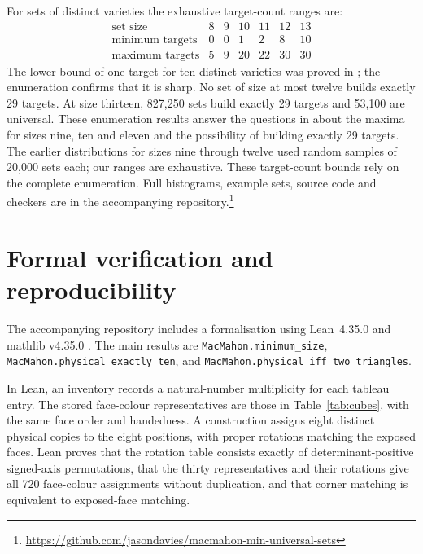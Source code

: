 \documentclass[11pt]{article}
\newcommand{\lean}[1]{\nolinkurl{#1}}
\begin{document}
For sets of distinct varieties the exhaustive target-count ranges are:
\[
\begin{array}{c|rrrrrr}
\text{set size}&8&9&10&11&12&13\\\hline
\text{minimum targets}&0&0&1&2&8&10\\
\text{maximum targets}&5&9&20&22&30&30
\end{array}
\]
The lower bound of one target for ten distinct varieties was proved in
\cite[Lemma~4.1]{B2017}; the enumeration confirms that it is sharp.
No set of size at most twelve builds exactly 29 targets. At size thirteen,
827,250 sets build exactly 29 targets and 53,100 are universal.
These enumeration results answer the questions in \cite[Section~6]{JR}
about the maxima for sizes nine, ten and eleven and the possibility of
building exactly 29 targets. The earlier distributions for sizes nine
through twelve used random samples of 20,000 sets each; our ranges are
exhaustive. These target-count bounds rely on the complete enumeration.
Full histograms, example sets, source code and checkers are in the
accompanying repository.\footnote{\url{https://github.com/jasondavies/macmahon-min-universal-sets}}

\section{Formal verification and reproducibility}\label{sec:formal}
The accompanying repository includes a formalisation using Lean~4.35.0
\cite{Lean4} and mathlib v4.35.0 \cite{mathlib}. The main results are
\lean{MacMahon.minimum_size}, \lean{MacMahon.physical_exactly_ten},
and \lean{MacMahon.physical_iff_two_triangles}.

In Lean, an inventory records a natural-number multiplicity for each tableau entry.
The stored face-colour representatives are those in Table~\ref{tab:cubes},
with the same face order and handedness.
A construction assigns eight distinct physical copies to the eight positions,
with proper rotations matching the exposed faces. Lean proves that the
rotation table consists exactly of determinant-positive signed-axis
permutations, that the thirty representatives and their rotations give all
720 face-colour assignments without duplication, and that corner matching
is equivalent to exposed-face matching.
\end{document}
